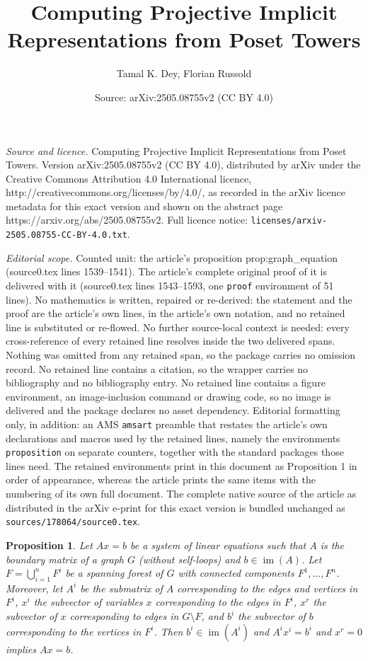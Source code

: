 \documentclass[10pt,a4paper]{amsart}
\title{Computing Projective Implicit Representations from Poset Towers}
\author{Tamal K. Dey, Florian Russold}
\date{Source: arXiv:2505.08755v2 (CC BY 4.0)}
\newtheorem{proposition}{Proposition}
\DeclareMathOperator{\im}{im}
\begin{document}
\maketitle

\noindent\emph{Source and licence.} Computing Projective Implicit Representations from Poset Towers. Version arXiv:2505.08755v2 (CC BY 4.0), distributed by arXiv under the Creative Commons Attribution 4.0 International licence, http://creativecommons.org/licenses/by/4.0/, as recorded in the arXiv licence metadata for this exact version and shown on the abstract page https://arxiv.org/abs/2505.08755v2. Full licence notice: \texttt{licenses/arxiv-2505.08755-CC-BY-4.0.txt}.\par\smallskip

\noindent\textit{Editorial scope.} Counted unit: the article's proposition prop:graph\_equation (source0.tex lines 1539--1541). The article's complete original proof of it is delivered with it (source0.tex lines 1543--1593, one \texttt{proof} environment of 51 lines). No mathematics is written, repaired or re-derived: the statement and the proof are the article's own lines, in the article's own notation, and no retained line is substituted or re-flowed.  No further source-local context is needed: every cross-reference of every retained line resolves inside the two delivered spans.  Nothing was omitted from any retained span, so the package carries no omission record.  No retained line contains a citation, so the wrapper carries no bibliography and no bibliography entry.  No retained line contains a figure environment, an image-inclusion command or drawing code, so no image is delivered and the package declares no asset dependency.  Editorial formatting only, in addition: an AMS \texttt{amsart} preamble that restates the article's own declarations and macros used by the retained lines, namely the environments \texttt{proposition} on separate counters, together with the standard packages those lines need.  The retained environments print in this document as Proposition 1 in order of appearance, whereas the article prints the same items with the numbering of its own full document.  The complete native source of the article as distributed in the arXiv e-print for this exact version is bundled unchanged as \texttt{sources/178064/source0.tex}.
\begin{proposition} \label{prop:graph_equation}
Let $Ax=b$ be a system of linear equations such that $A$ is the boundary matrix of a graph $G$ (without self-loops) and $b\in \im(A)$. Let $F=\bigcup_{i=1}^n F^i$ be a spanning forest of $G$ with connected components $F^1,\ldots,F^n$. Moreover, let $A^i$ be the submatrix of $A$ corresponding to the edges and vertices in $F^i$, $x^i$ the subvector of variables $x$ corresponding to the edges in $F^i$, $x^r$ the subvector of $x$ corresponding to edges in $G\setminus F$, and $b^i$ the subvector of $b$ corresponding to the vertices in $F^i$. Then $b^i\in\im(A^i)$ and $A^ix^i=b^i$ and $x^r=0$ implies $Ax=b$.  
\end{proposition}
\end{document}
